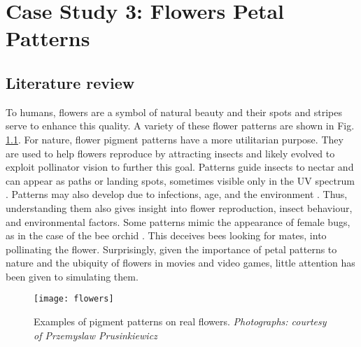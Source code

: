 \chapter{Case Study 3: Flowers Petal Patterns}

\section{Literature review}
To humans, flowers are a symbol of natural beauty and their spots and stripes serve to enhance this quality. A variety of these flower patterns are shown in Fig. \ref{fig:realFlowers}. For nature, flower pigment patterns have a more  utilitarian purpose. They are used to help flowers reproduce by attracting insects and likely evolved to exploit pollinator vision to further this goal. Patterns guide insects to nectar and can appear as paths or landing spots, sometimes visible only in the UV spectrum \citep{davies2012}. Patterns may also develop due to infections, age, and the environment \citep{davies2012, robinson2015}. Thus, understanding them also gives insight into flower reproduction, insect behaviour, and environmental factors. Some patterns mimic the appearance of female bugs, as in the case of the bee orchid \citep{vereecken7484}. This deceives bees looking for mates, into pollinating the flower. Surprisingly, given the importance of petal patterns to nature and the ubiquity of flowers in movies and video games, little attention has been given to simulating them. 

\begin{figure}[!ht]
	\centering
	\texttt{[image: flowers]}
	\caption{Examples of pigment patterns on real flowers. \textit{Photographs: courtesy of Przemyslaw Prusinkiewicz}}
	\label{fig:realFlowers}
\end{figure}


